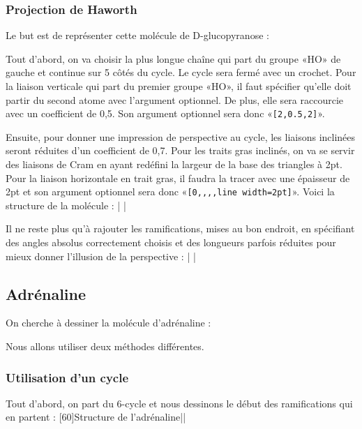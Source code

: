 \documentclass[10pt,french]{article}
\makeatletter
\newcommand\make@car@active[1]{%
	\catcode`#1\active
	\begingroup
		\lccode`\~`#1\relax
		\lowercase{\endgroup\def~}%
}
\newif\if@exstar
\newcommand\exemple{%
	\begingroup
	\parskip\z@
	\@makeother\;\@makeother\!\@makeother\?\@makeother\:%
	\@ifstar{\@exstartrue\exemple@}{\@exstarfalse\exemple@}}
\newcommand\exemple@[2][65]{%
	\medbreak\noindent
	\begingroup
		\let\do\@makeother\dospecials
		\make@car@active\ { {}}%
		\make@car@active\^^M{\par\leavevmode}%
		\make@car@active\^^I{\space\space}%
		\make@car@active\,{\leavevmode\kern\z@\string,}%
		\make@car@active\-{\leavevmode\kern\z@\string-}%
		\make@car@active\>{\leavevmode\kern\z@\string>}%
		\make@car@active\<{\leavevmode\kern\z@\string<}%
		\exemple@@{#1}{#2}%
}
\newcommand\exemple@@[3]{%
	\def\@tempa##1#3{\exemple@@@{#1}{#2}{##1}}%
	\@tempa
}
\newcommand\exemple@@@[3]{%
	\xdef\the@code{#3}%
	\endgroup
	\if@exstar
		\begingroup
			\fboxrule0.4pt
			\let\breakboxparindent\z@
			\def\bkvz@bottom{\hrule\@height\fboxrule}%
			\let\bkvz@before@breakbox\relax
			\def\bkvz@set@linewidth{\advance\linewidth\dimexpr-2\fboxrule-2\fboxsep}%
			\def\bkvz@left{\vrule\@width\fboxrule\hskip\fboxsep}%
			\def\bkvz@right{\hskip\fboxsep\vrule\@width\fboxrule}%
			\def\bkvz@top{\hbox to \hsize{%
				\vrule\@width\fboxrule\@height\fboxrule
				\leaders\bkvz@bottom\hfill
				\sffamily
				\fboxsep\z@
				\colorbox{black}{\kern0.25em\color{white}\footnotesize\lower0.5ex\hbox{\strut#2}\kern0.25em}%
				\leaders\bkvz@bottom\hfill
				\vrule\@width\fboxrule\@height\fboxrule}}%
			\breakbox
				\kern.5ex\relax
				\ttfamily\footnotesize\the@code\par
				\normalfont
				\kern3pt
				\hrule height0.1pt width\linewidth depth0.1pt
				\vskip5pt
				\rightskip0pt plus 1fill
				\everypar{{\color{lightgray}\rlap{\vrule height0.1pt width\linewidth depth0.1pt}}\hskip0pt plus 1fill}%
				\newlinechar`\^^M\everyeof{\noexpand}\scantokens{#3}\par
			\endbreakbox
		\endgroup
	\else
		\vskip0.5ex
		\boxput*(0,1)
			{\fboxsep\z@
			\hbox{\sffamily\colorbox{black}{\leavevmode\kern0.25em{\color{white}\footnotesize\strut#2}\kern0.25em}}%
			}%
			{\fboxsep5pt
			\fbox{%
				$\vcenter{\hsize\dimexpr0.#1\linewidth-\fboxsep-\fboxrule\relax
					\kern5pt\parskip0pt \ttfamily\footnotesize\the@code}%
				\vcenter{\kern5pt\hsize\dimexpr\linewidth-0.#1\linewidth-\fboxsep-\fboxrule\relax
					\everypar{{\color{lightgray}\rlap{\vrule height0.1pt width\dimexpr\linewidth-0.#1\linewidth-\fboxsep-\fboxrule depth0.1pt}}}%
					\footnotesize\newlinechar`\^^M\everyeof{\noexpand}\scantokens{#3}}$%
				}%
			}%
	\fi
	\medbreak
	\endgroup
}
\let\do\@makeother\dospecials
\makeatother
\begin{document}
\subsubsection{Projection de Haworth}
Le but est de représenter cette molécule de D-glucopyranose :
{
}

Tout d'abord, on va choisir la plus longue chaîne qui part du groupe «HO» de gauche et continue sur 5 côtés du cycle. Le cycle sera fermé avec un crochet. Pour la liaison verticale qui part du premier groupe «HO», il faut spécifier qu'elle doit partir du second atome avec l'argument optionnel. De plus, elle sera raccourcie avec un coefficient de 0,5. Son argument optionnel sera donc «\verb/[2,0.5,2]/».

Ensuite, pour donner une impression de perspective au cycle, les liaisons inclinées seront réduites d'un coefficient de 0,7. Pour les traits gras inclinés, on va se servir des liaisons de Cram en ayant redéfini la largeur de la base des triangles à 2pt. Pour la liaison horizontale en trait gras, il faudra la tracer  avec une épaisseur de 2pt et son argument optionnel sera donc «\verb/[0,,,,line width=2pt]/». Voici la structure de la molécule :
\exemple{Structure}|
|

Il ne reste plus qu'à rajouter les ramifications, mises au bon endroit, en spécifiant des angles absolus correctement choisis et des longueurs parfois réduites pour mieux donner l'illusion de la perspective :
\exemple{Projection de Haworth}|
|

\subsection{Adrénaline}
On cherche à dessiner la molécule d'adrénaline :

Nous allons utiliser deux méthodes différentes.

\subsubsection{Utilisation d'un cycle}
Tout d'abord, on part du 6-cycle et nous dessinons le début des ramifications qui en partent :
\exemple[60]{Structure de l'adrénaline}||
\end{document}
